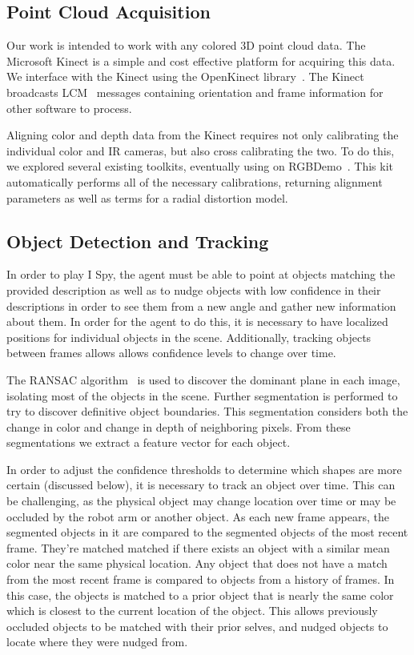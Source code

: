 \documentclass[11pt]{article}
\begin{document}
\subsection{Point Cloud Acquisition}
Our work is intended to work with any colored 3D point cloud data. The
Microsoft Kinect is a simple and cost effective platform for acquiring
this data. We interface with the Kinect using the OpenKinect
library~\cite{OpenKinect}. The Kinect broadcasts LCM~\cite{huang2010} messages
containing orientation and frame information for other software to process.

Aligning color and depth data from the Kinect requires not only
calibrating the individual color and IR cameras, but also cross calibrating
the two. To do this, we explored several existing toolkits, eventually
using on RGBDemo~\cite{rgbdemo}. This kit automatically performs all of the
necessary calibrations, returning alignment parameters as well as terms for a
radial distortion model.

\subsection{Object Detection and Tracking}
In order to play I Spy, the agent must be able to point at objects matching the
provided description as well as to nudge objects with low confidence in their
descriptions in order to see them from a new angle and gather new information
about them. In order for the agent to do this, it is necessary to have localized
positions for individual objects in the scene. Additionally, tracking objects
between frames allows allows confidence levels to change over time.

The RANSAC algorithm~\cite{fischler1981random} is used to discover the dominant
plane in each image, isolating most of the objects in the scene. Further
segmentation is performed to try to discover definitive object boundaries. This
segmentation considers both the change in color and change in depth of neighboring
pixels.
From these segmentations we extract a feature vector for each object.

In order to adjust the confidence thresholds to determine which shapes are more
certain (discussed below), it is necessary to track an object over time. This can
be challenging, as the physical object may change location over time or may be
occluded by the robot arm or another object. As each new frame appears, the
segmented objects in it are compared to the segmented objects of the most recent
frame. They're matched matched if there exists an object with a similar mean
color near the same physical location. Any object that does not have a match from
the most recent frame is compared to objects from a history of frames. In this case,
the objects is matched to a prior object that is nearly the same color which
is closest to the current location of the object. This allows previously occluded
objects to be matched with their prior selves, and nudged objects to locate where
they were nudged from.
\end{document}
